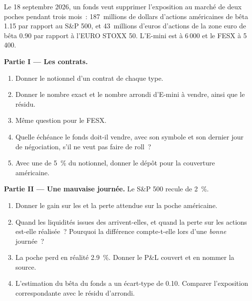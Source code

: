 \begin{problem}\label{pb:m1:futures-contracts-and-exchanges:1}
Le 18 septembre 2026, un fonds veut supprimer l'exposition au marché de deux
poches pendant trois mois~: 187~millions de dollars d'actions américaines de bêta 1.15 par rapport
au S\&P 500, et 43~millions d'euros d'actions de la zone euro de bêta 0.90 par rapport à
l'EURO STOXX 50. L'E-mini est à 6\,000 et le FESX à 5\,400.

\medskip\noindent\textbf{Partie I --- Les contrats.}
\begin{enumerate}
\item Donner le notionnel d'un contrat de chaque type.
\item Donner le nombre exact et le nombre arrondi d'E-mini à vendre, ainsi que
le résidu.
\item Même question pour le FESX.
\item Quelle échéance le fonds doit-il vendre, avec son symbole et son dernier jour
de négociation, s'il ne veut pas faire de roll~?
\item Avec une  de 5~\% du notionnel, donner le dépôt pour la couverture
américaine.
\end{enumerate}

\medskip\noindent\textbf{Partie II --- Une mauvaise journée.}
Le S\&P 500 recule de 2~\%.
\begin{enumerate}[resume]
\item Donner le gain sur les  et la perte attendue sur la poche américaine.
\item Quand les liquidités issues des  arrivent-elles, et quand la perte sur
les actions est-elle réalisée~? Pourquoi la différence compte-t-elle lors d'une \emph{bonne} journée~?
\item La poche perd en réalité 2.9~\%. Donner le P\&L couvert et en nommer
la source.
\item L'estimation du bêta du fonds a un écart-type de 0.10. Comparer
l'exposition correspondante avec le résidu d'arrondi.
\end{enumerate}


\end{problem}
